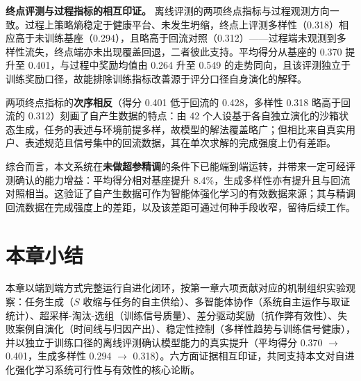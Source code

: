 \textbf{终点评测与过程指标的相互印证。} 离线评测的两项终点指标与过程观测方向一致。过程上策略熵稳定于健康平台、未发生坍缩，终点上评测多样性（0.318）相应高于未训练基座（0.294），且略高于回流对照（0.312）——过程端未观测到多样性流失，终点端亦未出现覆盖回退，二者彼此支持。平均得分从基座的 0.370 提升至 0.401，与过程中奖励均值由 0.264 升至 0.549 的走势同向，且该评测独立于训练奖励口径，故能排除训练指标改善源于评分口径自身演化的解释。

两项终点指标的\textbf{次序相反}（得分 0.401 低于回流的 0.428，多样性 0.318 略高于回流的 0.312）刻画了自产生数据的特点：由 42 个人设基于各自独立演化的沙箱状态生成，任务的表述与环境前提多样，故模型的解法覆盖略广；但相比来自真实用户、表述规范且信号集中的回流数据，其在单次求解的完成强度上仍有差距。

综合而言，本文系统在\textbf{未做超参精调}的条件下已能端到端运转，并带来一定可经评测确认的能力增益：平均得分相对基座提升 8.4\%，生成多样性亦有提升且与回流对照相当。这验证了自产生数据可作为智能体强化学习的有效数据来源；其与精调回流数据在完成强度上的差距，以及该差距可通过何种手段收窄，留待后续工作。

\section{本章小结}

本章以端到端方式完整运行自进化闭环，按第一章六项贡献对应的机制组织实验观察：任务生成（$S$ 收缩与任务的自主供给）、多智能体协作（系统自主运作与取证统计）、超采样-淘汰-选组（训练信号质量）、差分驱动奖励（抗作弊有效性）、失败案例自演化（时间线与归因产出）、稳定性控制（多样性趋势与训练信号健康），并以独立于训练口径的离线评测确认模型能力的真实提升（平均得分 0.370 $\to$ 0.401，生成多样性 0.294 $\to$ 0.318）。六方面证据相互印证，共同支持本文对自进化强化学习系统可行性与有效性的核心论断。
